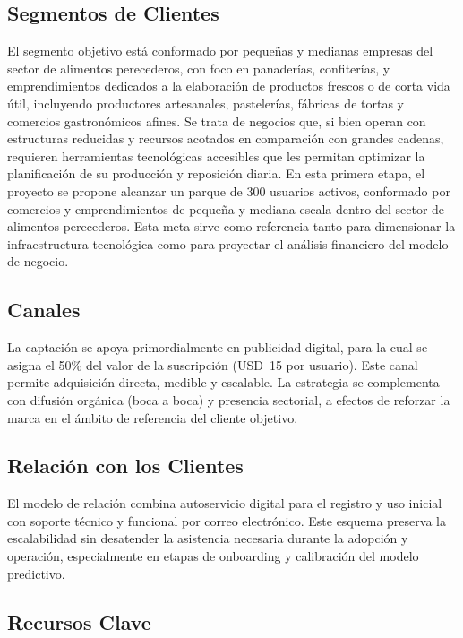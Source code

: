 \subsection{Segmentos de Clientes}
El segmento objetivo está conformado por pequeñas y medianas empresas del sector de alimentos perecederos, con foco en panaderías, confiterías, y emprendimientos dedicados a la elaboración de productos frescos o de corta vida útil, incluyendo productores artesanales, pastelerías, fábricas de tortas y comercios gastronómicos afines.
Se trata de negocios que, si bien operan con estructuras reducidas y recursos acotados en comparación con grandes cadenas, requieren herramientas tecnológicas accesibles que les permitan optimizar la planificación de su producción y reposición diaria.
En esta primera etapa, el proyecto se propone alcanzar un parque de 300 usuarios activos, conformado por comercios y emprendimientos de pequeña y mediana escala dentro del sector de alimentos perecederos. Esta meta sirve como referencia tanto para dimensionar la infraestructura tecnológica como para proyectar el análisis financiero del modelo de negocio.

\subsection{Canales}
La captación se apoya primordialmente en publicidad digital, para la cual se asigna el 50\% del valor de la suscripción (USD~15 por usuario). Este canal permite adquisición directa, medible y escalable. La estrategia se complementa con difusión orgánica (boca a boca) y presencia sectorial, a efectos de reforzar la marca en el ámbito de referencia del cliente objetivo.

\subsection{Relación con los Clientes}
El modelo de relación combina autoservicio digital para el registro y uso inicial con soporte técnico y funcional por correo electrónico. Este esquema preserva la escalabilidad sin desatender la asistencia necesaria durante la adopción y operación, especialmente en etapas de onboarding y calibración del modelo predictivo.

\subsection{Recursos Clave}

